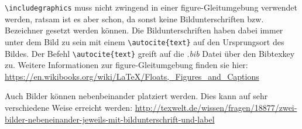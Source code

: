 \verb|\includegraphics| muss nicht zwingend in einer figure-Gleitumgebung verwendet werden, ratsam ist es aber schon, da sonst keine Bildunterschriften bzw. Bezeichner gesetzt werden können. Die Bildunterschriften haben dabei immer unter dem Bild zu sein mit einem \verb|\autocite{text}| auf den Ursprungsort des Bildes. Der Befehl \verb|\autocite{text}| greift auf die \emph{.bib} Datei über den Bibtexkey zu. Weitere Informationen zur figure-Gleitumgebung finden sie hier: \url{https://en.wikibooks.org/wiki/LaTeX/Floats,_Figures_and_Captions}\newline

Auch Bilder können nebenbeinander platziert werden. Dies kann auf sehr verschiedene Weise erreicht werden: \url{http://texwelt.de/wissen/fragen/18877/zwei-bilder-nebeneinander-jeweils-mit-bildunterschrift-und-label} 

